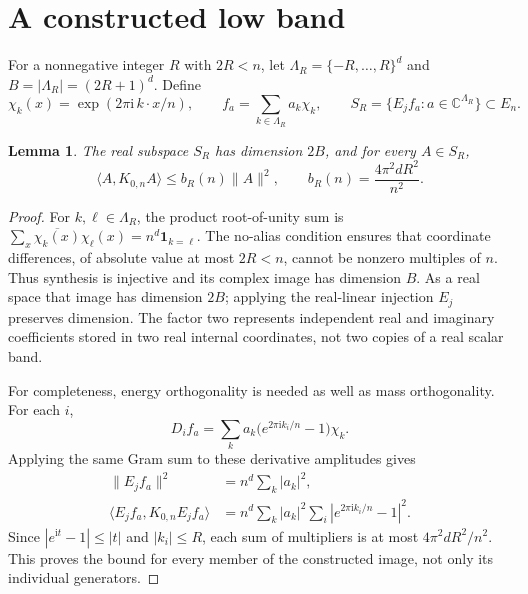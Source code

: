 \documentclass[11pt]{article}
\newtheorem{lemma}[theorem]{Lemma}
\newcommand{\C}{\mathbb C}
\newcommand{\ip}[2]{\langle #1,#2\rangle}
\begin{document}
\section{A constructed low band}
For a nonnegative integer $R$ with $2R<n$, let $\Lambda_R=\{-R,\ldots,R\}^d$ and
$B=|\Lambda_R|=(2R+1)^d$. Define
\[
 \chi_k(x)=\exp(2\pi\mathrm i\,k\cdot x/n),\qquad
 f_a=\sum_{k\in\Lambda_R}a_k\chi_k,\qquad
 S_R=\{E_j f_a:a\in\C^{\Lambda_R}\}\subset E_n.
\]
\begin{lemma}\label{lem:band}
The real subspace $S_R$ has dimension $2B$, and for every $A\in S_R$,
\begin{equation}\label{eq:band}
 \ip{A}{K_{0,n}A}\leq b_R(n)\|A\|^2,
 \qquad b_R(n)=\frac{4\pi^2dR^2}{n^2}.
\end{equation}
\end{lemma}
\begin{proof}
For $k,\ell\in\Lambda_R$, the product root-of-unity sum is
$\sum_x\overline{\chi_k(x)}\chi_\ell(x)=n^d\mathbf1_{k=\ell}$.
The no-alias condition ensures that coordinate differences, of absolute value
at most $2R<n$, cannot be nonzero multiples of $n$. Thus synthesis is injective
and its complex image has dimension $B$. As a real space that image has
dimension $2B$; applying the real-linear injection $E_j$ preserves dimension.
The factor two represents independent real and imaginary coefficients stored
in two real internal coordinates, not two copies of a real scalar band.

For completeness, energy orthogonality is needed as well as mass orthogonality.
For each $i$,
\[
 D_i f_a=\sum_k a_k\bigl(e^{2\pi\mathrm i k_i/n}-1\bigr)\chi_k.
\]
Applying the same Gram sum to these derivative amplitudes gives
\begin{align*}
 \|E_jf_a\|^2&=n^d\sum_k|a_k|^2,\\
 \ip{E_jf_a}{K_{0,n}E_jf_a}
 &=n^d\sum_k |a_k|^2\sum_i|e^{2\pi\mathrm i k_i/n}-1|^2.
\end{align*}
Since $|e^{\mathrm it}-1|\leq|t|$ and $|k_i|\leq R$, each sum of multipliers
is at most $4\pi^2dR^2/n^2$. This proves the bound for every member of the
constructed image, not only its individual generators.
\end{proof}
\end{document}
